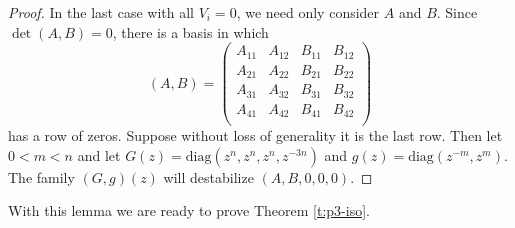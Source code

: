 \begin{proof}
		In the last case with all $V_i=0$, we need only consider $A$ and $B$. Since $\det(A,B) = 0$, there is a basis in which
		\begin{equation}
			(A,B) = 
			\begin{pmatrix}
		A_{11} & A_{12}	& B_{11} & B_{12}\\
		A_{21} & A_{22} & B_{21} & B_{22}\\
		A_{31} & A_{32} & B_{31} & B_{32}\\
		A_{41} & A_{42} & B_{41} & B_{42}\\
			\end{pmatrix}
		\end{equation}
		has a row of zeros. Suppose without loss of generality it is the last row. Then let $0 < m < n$ and let $G(z) = \text{diag}(z^{n}, z^{n}, z^{n}, z^{-3n})$ and $g(z) = \text{diag}(z^{-m}, z^{m})$. The family $(G,g)(z)$ will destabilize $(A,B,0,0,0)$. 
	
	\end{proof}
	With this lemma we are ready to prove Theorem \ref{t:p3-iso}.
